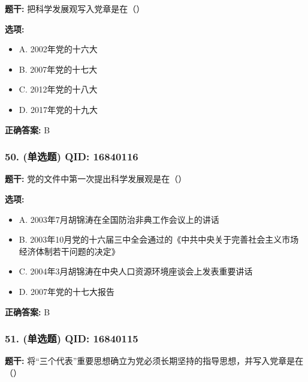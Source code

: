 \documentclass[12pt,UTF8]{ctexart}
\begin{document}
\textbf{题干:}
把科学发展观写入党章是在（）

\textbf{选项:}
\begin{itemize}[leftmargin=*]

  \item A. 2002年党的十六大

  \item B. 2007年党的十七大

  \item C. 2012年党的十八大

  \item D. 2017年党的十九大

\end{itemize}

\textbf{正确答案:}
B

\vspace{0.3em}\hrulefill\vspace{0.7em}

\subsubsection*{50. (单选题) \small QID: 16840116}

\textbf{题干:}
党的文件中第一次提出科学发展观是在（）

\textbf{选项:}
\begin{itemize}[leftmargin=*]

  \item A. 2003年7月胡锦涛在全国防治非典工作会议上的讲话

  \item B. 2003年10月党的十六届三中全会通过的《中共中央关于完善社会主义市场经济体制若干问题的决定》

  \item C. 2004年3月胡锦涛在中央人口资源环境座谈会上发表重要讲话

  \item D. 2007年党的十七大报告

\end{itemize}

\textbf{正确答案:}
B

\vspace{0.3em}\hrulefill\vspace{0.7em}

\subsubsection*{51. (单选题) \small QID: 16840115}

\textbf{题干:}
将“三个代表”重要思想确立为党必须长期坚持的指导思想，并写入党章是在（）
\end{document}
